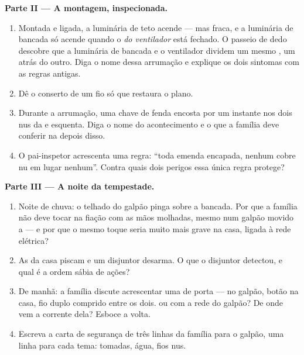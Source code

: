 \begin{problem}
\medskip\noindent\textbf{Parte II --- A montagem, inspecionada.}
\begin{enumerate}[resume]
  \item Montada e ligada, a luminária de teto acende --- mas fraca, e
        a luminária de bancada só acende quando o 
        \emph{do ventilador} está fechado. O passeio de dedo
        descobre que a luminária de bancada e o ventilador dividem um
        mesmo , um atrás do outro. Diga o nome dessa arrumação e
        explique os dois sintomas com as regras antigas.
  \item Dê o conserto de um fio só que restaura o plano.
  \item Durante a arrumação, uma chave de fenda encosta por um
        instante nos dois  nus da  e esquenta. Diga o
        nome do acontecimento e o que a família deve conferir na
         depois disso.
  \item O pai-inspetor acrescenta uma regra: ``toda emenda
        encapada, nenhum cobre nu em lugar nenhum''. Contra quais
        dois perigos essa única regra protege?
\end{enumerate}

\medskip\noindent\textbf{Parte III --- A noite da tempestade.}
\begin{enumerate}[resume]
  \item Noite de chuva: o telhado do galpão pinga sobre a bancada.
        Por que a família não deve tocar na fiação com as mãos
        molhadas, mesmo num galpão movido a  --- e por que o
        mesmo toque seria muito mais grave na casa, ligada à rede
        elétrica?
  \item As  da casa piscam e um disjuntor desarma. O que o
        disjuntor detectou, e qual é a ordem sábia de ações?
  \item De manhã: a família discute acrescentar uma  de
        porta ---  no galpão, botão na casa, fio duplo
        comprido entre os dois.  ou  com a rede do
        galpão? De onde vem a corrente dela? Esboce a volta.
  \item Escreva a carta de segurança de três linhas da família para o
        galpão, uma linha para cada tema: tomadas, água, fios nus.
\end{enumerate}
\end{problem}
